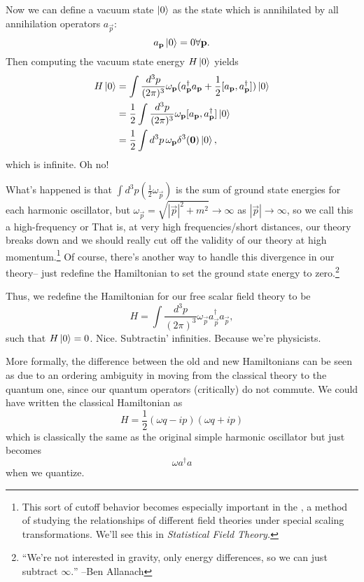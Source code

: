 Now we can define a vacuum state $\left| 0 \right>$ as the state which is annihilated by all annihilation operators $a_{\vec p}$: 
$$a_{\boldsymbol{\mathbf{p}}}\left| 0 \right>=0 \forall \boldsymbol{\mathbf{p}}.$$
Then computing the vacuum state energy $H\left| 0 \right>$ yields
\begin{align*}
    H\left| 0 \right>&=\int \frac{d^3p}{(2\pi)^3}\omega_{\boldsymbol{\mathbf{p}}} (a_{\boldsymbol{\mathbf{p}}}^\dagger a_{\boldsymbol{\mathbf{p}}} + \frac{1}{2}[a_{\boldsymbol{\mathbf{p}}}, a_{\boldsymbol{\mathbf{p}}}^\dagger])\left| 0 \right>\\
    &=\frac{1}{2}\int \frac{d^3 p}{(2\pi)^3}\omega_{\boldsymbol{\mathbf{p}}} [a_{\boldsymbol{\mathbf{p}}}, a^\dagger_{\boldsymbol{\mathbf{p}}}] \left| 0 \right>\\
    &= \frac{1}{2}\int d^3 p \,\omega_{\boldsymbol{\mathbf{p}}} \delta^3 (\boldsymbol{\mathbf{0}})\left| 0 \right>,
\end{align*}
which is infinite. Oh no!

What's happened is that $\int d^3p \left(\frac{1}{2}\omega_{\vec p}\right)$ is the sum of ground state energies for each harmonic oscillator, but $\omega_{\vec p} =\sqrt{|\vec p|^2 + m^2} \to \infty$ as $|\vec p|\to \infty$, so we call this a high-frequency or  That is, at very high frequencies/short distances, our theory breaks down and we should really cut off the validity of our theory at high momentum.\footnote{This sort of cutoff behavior becomes especially important in the , a method of studying the relationships of different field theories under special scaling transformations. We'll see this in \emph{Statistical Field Theory.}} Of course, there's another way to handle this divergence in our theory-- just redefine the Hamiltonian to set the ground state energy to zero.\footnote{``We're not interested in gravity, only energy differences, so we can just subtract $\infty.$'' --Ben Allanach}

Thus, we redefine the Hamiltonian for our free scalar field theory to be
$$H=\int \frac{d^3 p}{(2\pi)^3} \omega_{\vec p} a_{\vec p}^\dagger a_{\vec p},$$
such that $H\left| 0 \right>=0$. Nice. Subtractin' infinities. Because we're physicists.

More formally, the difference between the old and new Hamiltonians can be seen as due to an ordering ambiguity in moving from the classical theory to the quantum one, since our quantum operators (critically) do not commute. We could have written the classical Hamiltonian as
$$H=\frac{1}{2}(\omega q-ip)(\omega q+ ip)$$
which is classically the same as the original simple harmonic oscillator but just becomes
$$\omega a^\dagger a$$ when we quantize.

